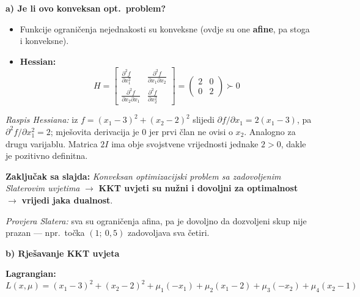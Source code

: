 \begin{zadatak}
\medskip
\textbf{a) Je li ovo konveksan opt.\ problem?} 

\begin{itemize}
  \item Funkcije ograničenja nejednakosti su konveksne (ovdje su one
        \textbf{afine}, pa stoga i konveksne).
  \item \textbf{Hessian:}
        \[
        H = \begin{bmatrix}
        \frac{\partial^2 f}{\partial x_1^2} &
        \frac{\partial^2 f}{\partial x_1\partial x_2} \\[4pt]
        \frac{\partial^2 f}{\partial x_2\partial x_1} &
        \frac{\partial^2 f}{\partial x_2^2}
        \end{bmatrix}
        = \begin{pmatrix} 2 & 0 \\ 0 & 2 \end{pmatrix} \succ 0
        \]
\end{itemize}

\emph{Raspis Hessiana:} iz $f = (x_1-3)^2 + (x_2-2)^2$ slijedi
$\partial f/\partial x_1 = 2(x_1-3)$, pa
$\partial^2 f/\partial x_1^2 = 2$; mješovita derivacija je $0$ jer prvi član ne
ovisi o $x_2$. Analogno za drugu varijablu. Matrica $2I$ ima obje svojstvene
vrijednosti jednake $2 > 0$, dakle je pozitivno definitna. \checkmark

\textbf{Zaključak sa slajda:} \emph{Konveksan optimizacijski problem sa
zadovoljenim Slaterovim uvjetima} $\to$ \textbf{KKT uvjeti su nužni i dovoljni
za optimalnost} $\to$ \textbf{vrijedi jaka dualnost}.

\emph{Provjera Slatera:} sva su ograničenja afina, pa je dovoljno da dozvoljeni
skup nije prazan --- npr.\ točka $(1;\ 0{,}5)$ zadovoljava sva četiri.
\checkmark

\medskip
\textbf{b) Rješavanje KKT uvjeta} 

\textbf{Lagrangian:}
\[
L(x,\mu) = (x_1-3)^2 + (x_2-2)^2 + \mu_1(-x_1) + \mu_2(x_1-2)
         + \mu_3(-x_2) + \mu_4(x_2-1)
\]


\end{zadatak}
